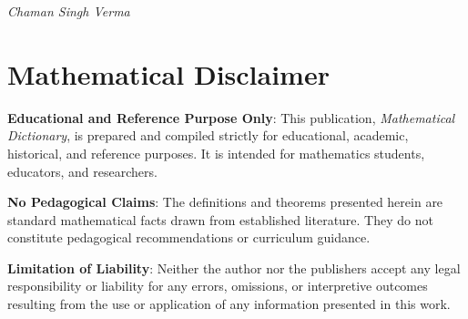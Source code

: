 \documentclass[11pt,twocolumn,twoside]{book}
\begin{document}
\medskip

\noindent\textit{Chaman Singh Verma}


\chapter*{Mathematical Disclaimer}

\noindent \textbf{Educational and Reference Purpose Only}: This publication, \textit{Mathematical Dictionary}, is prepared and compiled strictly for educational, academic, historical, and reference purposes. It is intended for mathematics students, educators, and researchers.

\medskip

\noindent \textbf{No Pedagogical Claims}: The definitions and theorems presented herein are standard mathematical facts drawn from established literature. They do not constitute pedagogical recommendations or curriculum guidance.

\medskip

\noindent \textbf{Limitation of Liability}: Neither the author nor the publishers accept any legal responsibility or liability for any errors, omissions, or interpretive outcomes resulting from the use or application of any information presented in this work.

\newpage
\twocolumn
\mainmatter



























\end{document}
